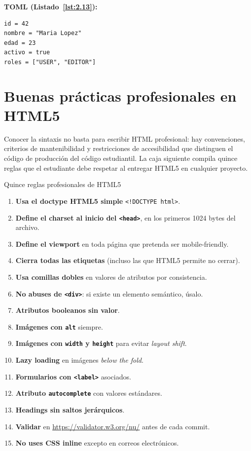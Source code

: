\textbf{TOML (Listado~\ref{lst:2.13}):}
\begin{lstlisting}[style=shell,numbers=none,caption={Ejemplo de Shell},label=lst:2.13]
id = 42
nombre = "Maria Lopez"
edad = 23
activo = true
roles = ["USER", "EDITOR"]
\end{lstlisting}

\section{Buenas prácticas profesionales en HTML5}

Conocer la sintaxis no basta para escribir HTML profesional:
hay convenciones, criterios de mantenibilidad y restricciones de
accesibilidad que distinguen el código de producción del código
estudiantil. La caja siguiente compila quince reglas que el
estudiante debe respetar al entregar HTML5 en cualquier proyecto.


\begin{cajabuenas}{Quince reglas profesionales de HTML5}
\begin{enumerate}
\item \textbf{Usa el doctype HTML5 simple} \texttt{<!DOCTYPE html>}.
\item \textbf{Define el charset al inicio del \texttt{<head>}}, en
los primeros 1024 bytes del archivo.
\item \textbf{Define el viewport} en toda página que pretenda ser
mobile-friendly.
\item \textbf{Cierra todas las etiquetas} (incluso las que HTML5
permite no cerrar).
\item \textbf{Usa comillas dobles} en valores de atributos por
consistencia.
\item \textbf{No abuses de \texttt{<div>}}: si existe un elemento
semántico, úsalo.
\item \textbf{Atributos booleanos sin valor}.
\item \textbf{Imágenes con \texttt{alt}} siempre.
\item \textbf{Imágenes con \texttt{width} y \texttt{height}} para
evitar \emph{layout shift}.
\item \textbf{Lazy loading} en imágenes \emph{below the fold}.
\item \textbf{Formularios con \texttt{<label>}} asociados.
\item \textbf{Atributo \texttt{autocomplete}} con valores estándares.
\item \textbf{Headings sin saltos jerárquicos}.
\item \textbf{Validar} en \url{https://validator.w3.org/nu/} antes
de cada commit.
\item \textbf{No uses CSS inline} excepto en correos electrónicos.
\end{enumerate}
\end{cajabuenas}


